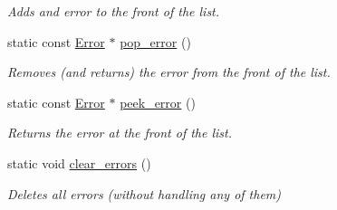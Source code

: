 \begin{DoxyCompactItemize}
\begin{DoxyCompactList}\small\item\em Adds and error to the front of the list. \end{DoxyCompactList}\item 
\mbox{\label{classnta_1_1ErrorManager_a42c52e9cb6537922b10b4f2546af1b7d}} 
static const \hyperlink{structnta_1_1Error}{Error} $\ast$ \hyperlink{classnta_1_1ErrorManager_a42c52e9cb6537922b10b4f2546af1b7d}{pop\+\_\+error} ()
\begin{DoxyCompactList}\small\item\em Removes (and returns) the error from the front of the list. \end{DoxyCompactList}\item 
\mbox{\label{classnta_1_1ErrorManager_ad156e8dea6b2a7d98d17043ec08cb812}} 
static const \hyperlink{structnta_1_1Error}{Error} $\ast$ \hyperlink{classnta_1_1ErrorManager_ad156e8dea6b2a7d98d17043ec08cb812}{peek\+\_\+error} ()
\begin{DoxyCompactList}\small\item\em Returns the error at the front of the list. \end{DoxyCompactList}\item 
\mbox{\label{classnta_1_1ErrorManager_a45dcc13a0acec8c4d2cc69d9b52be305}} 
static void \hyperlink{classnta_1_1ErrorManager_a45dcc13a0acec8c4d2cc69d9b52be305}{clear\+\_\+errors} ()
\begin{DoxyCompactList}\small\item\em Deletes all errors (without handling any of them) \end{DoxyCompactList}\end{DoxyCompactItemize}
